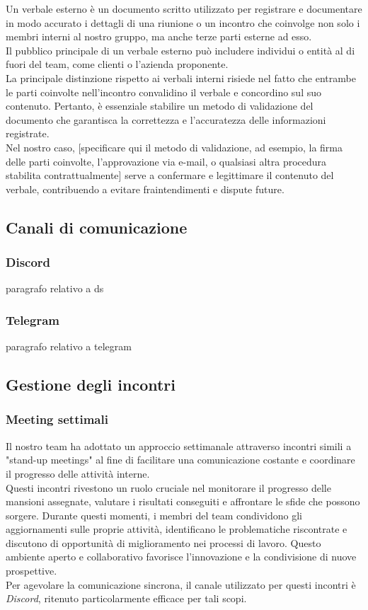 \documentclass{article}
\begin{document}
Un verbale esterno è un documento scritto utilizzato per registrare e documentare in modo accurato i dettagli di una riunione o un incontro che coinvolge non solo i membri interni al nostro gruppo, ma anche terze parti esterne ad esso.\\
Il pubblico principale di un verbale esterno può includere individui o entità al di fuori del team, come clienti o l'azienda proponente.\\
La principale distinzione rispetto ai verbali interni risiede nel fatto che entrambe le parti coinvolte nell'incontro convalidino il verbale e concordino sul suo contenuto. Pertanto, è essenziale stabilire un metodo di validazione del documento che garantisca la correttezza e l'accuratezza delle informazioni registrate.\\
Nel nostro caso, [specificare qui il metodo di validazione, ad esempio, la firma delle parti coinvolte, l'approvazione via e-mail, o qualsiasi altra procedura stabilita contrattualmente] serve a confermare e legittimare il contenuto del verbale, contribuendo a evitare fraintendimenti e dispute future.

\subsection{Canali di comunicazione}
\subsubsection{Discord}
paragrafo relativo a ds
\subsubsection{Telegram}
paragrafo relativo a telegram

\subsection{Gestione degli incontri}
\subsubsection{Meeting settimali}
Il nostro team ha adottato un approccio settimanale attraverso incontri simili a "stand-up meetings" al fine di facilitare una comunicazione costante e coordinare il progresso delle attività interne.\\
Questi incontri rivestono un ruolo cruciale nel monitorare il progresso delle mansioni assegnate, valutare i risultati conseguiti e affrontare le sfide che possono sorgere. Durante questi momenti, i membri del team condividono gli aggiornamenti sulle proprie attività, identificano le problematiche riscontrate e discutono di opportunità di miglioramento nei processi di lavoro. Questo ambiente aperto e collaborativo favorisce l'innovazione e la condivisione di nuove prospettive.\\
Per agevolare la comunicazione sincrona, il canale utilizzato per questi incontri è \textit{Discord}, ritenuto particolarmente efficace per tali scopi.
\end{document}
